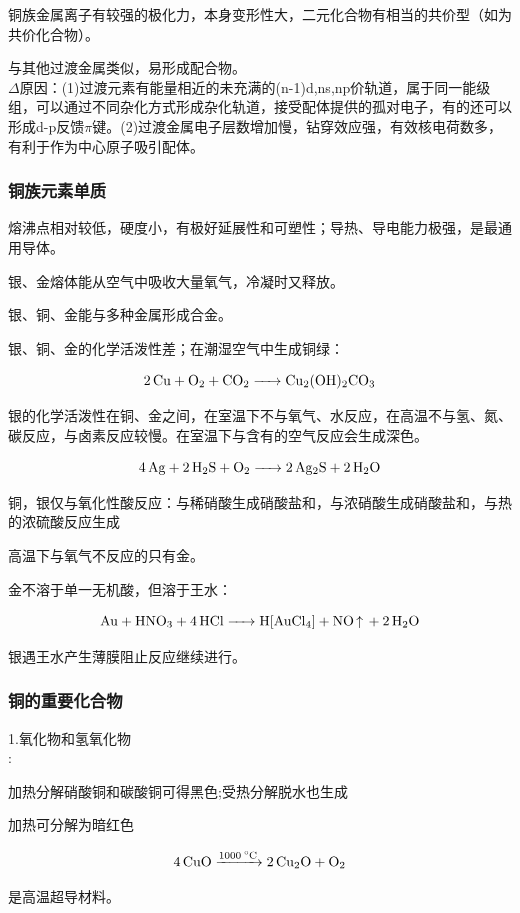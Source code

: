 \documentclass[a4paper,UTF8]{article}
\begin{document}
铜族金属离子有较强的极化力，本身变形性大，二元化合物有相当的共价型（如为共价化合物）。

与其他过渡金属类似，易形成配合物。\\$\Delta$原因：(1)过渡元素有能量相近的未充满的(n-1)d,ns,np价轨道，属于同一能级组，可以通过不同杂化方式形成杂化轨道，接受配体提供的孤对电子，有的还可以形成d-p反馈$\pi$键。(2)过渡金属电子层数增加慢，钻穿效应强，有效核电荷数多，有利于作为中心原子吸引配体。

\subsubsection{铜族元素单质}
熔沸点相对较低，硬度小，有极好延展性和可塑性；导热、导电能力极强，是最通用导体。

银、金熔体能从空气中吸收大量氧气，冷凝时又释放。

银、铜、金能与多种金属形成合金。

银、铜、金的化学活泼性差；在潮湿空气中生成铜绿：

$$ \ce{2Cu + O2 + CO2 -> Cu2(OH)2CO3} $$

银的化学活泼性在铜、金之间，在室温下不与氧气、水反应，在高温不与氢、氮、碳反应，与卤素反应较慢。在室温下与含有的空气反应会生成深色。

$$ \ce{4Ag + 2H2S + O2 -> 2Ag2S + 2H2O} $$

铜，银仅与氧化性酸反应：与稀硝酸生成硝酸盐和，与浓硝酸生成硝酸盐和，与热的浓硫酸反应生成

高温下与氧气不反应的只有金。

金不溶于单一无机酸，但溶于王水：

$$ \ce{Au + HNO3 + 4HCl ->H[AuCl4] + NO\ce{^} + 2H2O} $$

银遇王水产生薄膜阻止反应继续进行。

\subsubsection{铜的重要化合物}
1.氧化物和氢氧化物\\

:

加热分解硝酸铜和碳酸铜可得黑色;受热分解脱水也生成

加热可分解为暗红色

$$ \ce{4CuO ->[1000^\circ C] 2Cu2O + O2} $$

是高温超导材料。\\
\end{document}
